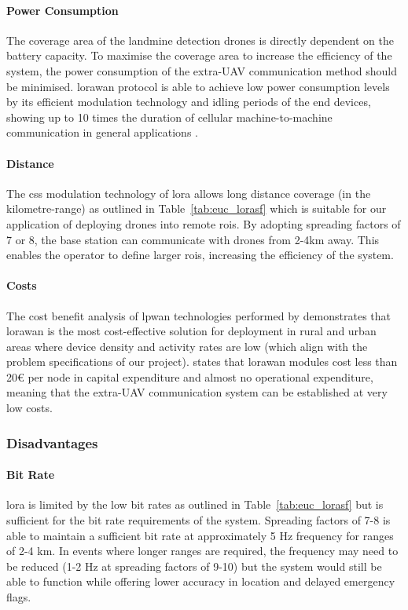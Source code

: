 \paragraph{Power Consumption} The coverage area of the landmine detection drones is directly dependent on the battery capacity. To maximise the coverage area to increase the efficiency of the system, the power consumption of the extra-\gls{UAV} communication method should be minimised. \gls{lorawan} protocol is able to achieve low power consumption levels by its efficient modulation technology and idling periods of the end devices, showing up to 10 times the duration of cellular machine-to-machine communication in general applications \cite{semtech2024lora}. 

\paragraph{Distance} The \gls{css} modulation technology of \gls{lora} allows long distance coverage (in the kilometre-range) as outlined in Table~\ref{tab:euc_lorasf} which is suitable for our application of deploying drones into remote \gls{roi}s. By adopting spreading factors of 7 or 8, the base station can communicate with drones from 2-4km away. This enables the operator to define larger \gls{roi}s, increasing the efficiency of the system. 

\paragraph{Costs} The cost benefit analysis of \gls{lpwan} technologies performed by \cite{hossain2021lpwancosts} demonstrates that \gls{lorawan} is the most cost-effective solution for deployment in rural and urban areas where device density and activity rates are low (which align with the problem specifications of our project). \cite{stokking2021lorawan} states that \gls{lorawan} modules cost less than 20€ per node in capital expenditure and almost no operational expenditure, meaning that the extra-\gls{UAV} communication system can be established at very low costs.
 
\subsubsection{Disadvantages}

\paragraph{Bit Rate} \gls{lora} is limited by the low bit rates as outlined in Table~\ref{tab:euc_lorasf} but is sufficient for the bit rate requirements of the system. Spreading factors of 7-8 is able to maintain a sufficient bit rate at approximately 5 Hz frequency for ranges of 2-4 km. In events where longer ranges are required, the frequency may need to be reduced (1-2 Hz at spreading factors of 9-10) but the system would still be able to function while offering lower accuracy in location and delayed emergency flags. 

